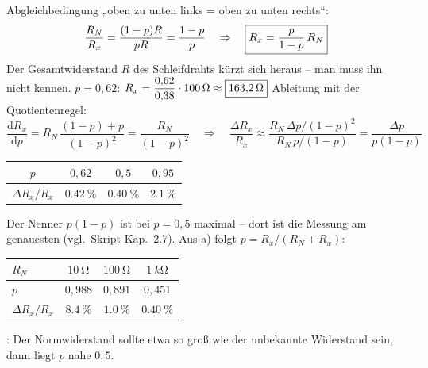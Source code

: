 \documentclass[11pt,a4paper]{article}
\begin{document}
\begin{loesung}
Abgleichbedingung „oben zu unten links = oben zu unten rechts“:
\[
  \frac{R_N}{R_x} = \frac{(1-p)R}{pR} = \frac{1-p}{p}
  \quad\Rightarrow\quad \boxed{R_x = \frac{p}{1-p}\,R_N}
\]
Der Gesamtwiderstand $R$ des Schleifdrahts kürzt sich heraus -- man muss ihn nicht kennen.
$p = 0{,}62$:\quad
$R_x = \dfrac{0{,}62}{0{,}38}\cdot\SI{100}{\ohm} \approx \boxed{\SI{163.2}{\ohm}}$
Ableitung mit der Quotientenregel:
\[
  \frac{\mathrm{d}R_x}{\mathrm{d}p} = R_N\,\frac{(1-p)+p}{(1-p)^2} = \frac{R_N}{(1-p)^2}
  \quad\Rightarrow\quad
  \frac{\Delta R_x}{R_x} \approx \frac{R_N\,\Delta p/(1-p)^2}{R_N\,p/(1-p)} = \frac{\Delta p}{p(1-p)}
\]
\begin{center}
\begin{tabular}{cccc}
\toprule
$p$ & $0{,}62$ & $0{,}5$ & $0{,}95$\\\midrule
$\Delta R_x/R_x$ & $\SI{0.42}{\percent}$ & $\SI{0.40}{\percent}$ & $\SI{2.1}{\percent}$\\\bottomrule
\end{tabular}
\end{center}
Der Nenner $p(1-p)$ ist bei $p = 0{,}5$ maximal -- dort ist die Messung am genauesten (vgl.\ Skript Kap.~2.7).
Aus a) folgt $p = R_x/(R_N+R_x)$:
\begin{center}
\begin{tabular}{lccc}
\toprule
$R_N$ & $\SI{10}{\ohm}$ & $\SI{100}{\ohm}$ & $\SI{1}{k\ohm}$\\\midrule
$p$ & $0{,}988$ & $0{,}891$ & $0{,}451$\\
$\Delta R_x/R_x$ & $\SI{8.4}{\percent}$ & $\SI{1.0}{\percent}$ & $\SI{0.40}{\percent}$\\\bottomrule
\end{tabular}
\end{center}
: Der Normwiderstand sollte etwa so groß wie der unbekannte Widerstand sein, dann liegt $p$ nahe $0{,}5$.
\end{loesung}
\end{document}
